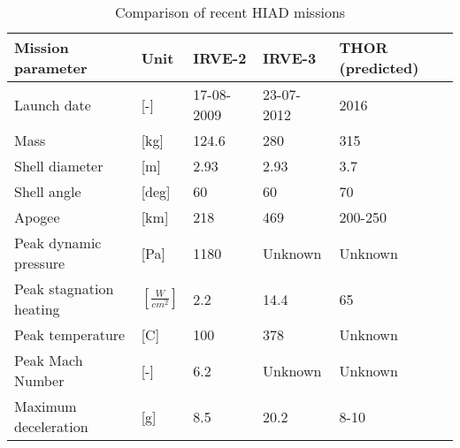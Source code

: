 \begin{table}[h!]
	\caption{Comparison of recent HIAD missions}%
		\begin{tabular}{|p{}|p{}|p{}|p{}|p{}|} %
			\hline

       Mission parameter   &       Unit &     IRVE-2 \cite{Dillman2010} &     IRVE-3 \citep{Dillman2012,Dillman2014} & THOR (predicted) \citep{Dillman2014} \\
			\hline \hline

Launch date &          [-] & 17-08-2009 & 23-07-2012 &       2016 \\
			\hline

      Mass &         [kg] &    124.6 &        280 &        315 \\
			\hline

Shell diameter &          [m] &       2.93 &       2.93 &        3.7 \\
			\hline

Shell angle &     [deg] &         60 &         60 &         70 \\
			\hline

    Apogee &         [km] &        218 &        469 &    200-250 \\
			\hline

Peak dynamic pressure &         [Pa] &       1180 &   Unknown         &   Unknown         \\
			\hline

Peak stagnation heating &     $ [\frac{W}{cm^{2}}]$ &        2.2 &       14.4 &         65 \\
			\hline

Peak temperature &          [C] &        100 &        378 &      Unknown      \\
			\hline

Peak Mach Number &          [-] &        6.2 &  Unknown          &   Unknown         \\
			\hline

Maximum deceleration &          [g] &        8.5 &       20.2 &       8-10 \\
			\hline

		\end{tabular}
    \label{tab:hiadcomparison}%
\end{table}

